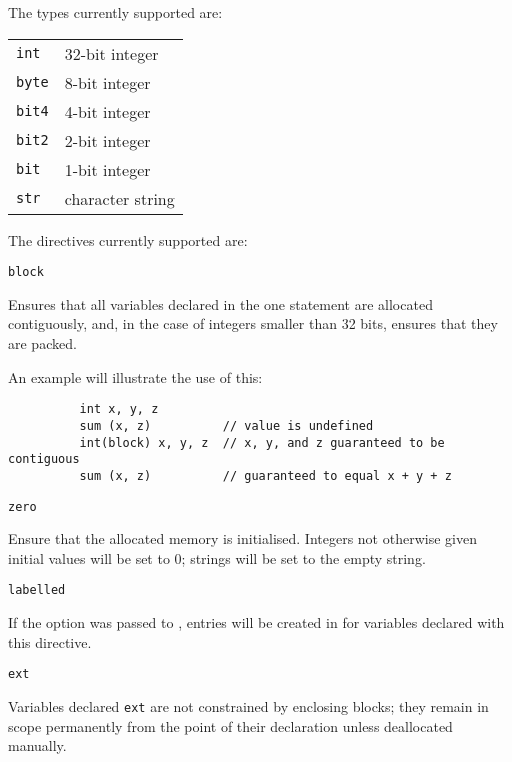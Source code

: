       The types currently supported are:

      \begin{tabular}{l@{\hs}l}
      \texttt{int} & 32-bit integer \\
      \texttt{byte} & 8-bit integer \\
      \texttt{bit4} & 4-bit integer \\
      \texttt{bit2} & 2-bit integer \\
      \texttt{bit}  & 1-bit integer \\
      \texttt{str}  & character string
      \end{tabular}

      The directives currently supported are:

      \prespace\texttt{block}
      \begin{cmdesc}
        Ensures that all variables declared in the one statement are allocated
        contiguously, and, in the case of integers smaller than 32 bits, ensures
        that they are packed.
        
        An example will illustrate the use of this:
        \begin{lstlisting}
          int x, y, z
          sum (x, z)          // value is undefined
          int(block) x, y, z  // x, y, and z guaranteed to be contiguous
          sum (x, z)          // guaranteed to equal x + y + z
        \end{lstlisting}
      \end{cmdesc}

      \prespace\texttt{zero}
      \begin{cmdesc}
        Ensure that the allocated memory is initialised.  Integers not otherwise
        given initial values will be set to 0; strings will be set to the empty
        string.
      \end{cmdesc}

      \prespace\texttt{labelled}
      \begin{cmdesc}
        If the  option was passed to \compiler{}, entries
        will be created in  for variables declared with this
        directive.
      \end{cmdesc}

      \prespace\texttt{ext}
      \begin{cmdesc}
        Variables declared \texttt{ext} are not constrained by enclosing 
        blocks; they remain in scope permanently from the point of their 
        declaration unless deallocated manually.        
      \end{cmdesc}

